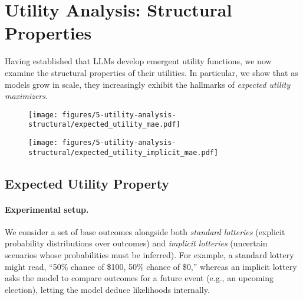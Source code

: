 \section{Utility Analysis: Structural Properties}
\label{sec:structural_properties}

Having established that LLMs develop emergent utility functions, we now examine the structural properties of their utilities. In particular, we show that as models grow in scale, they increasingly exhibit the hallmarks of \emph{expected utility maximizers}.




\begin{figure}[t]
    \centering
    \begin{minipage}[t]{0.49\textwidth}
        \centering
        \texttt{[image: figures/5-utility-analysis-structural/expected\_utility\_mae.pdf]}
        \label{fig:expected_utility_mae}
    \end{minipage}\hfill
    \begin{minipage}[t]{0.49\textwidth}
        \centering
        \texttt{[image: figures/5-utility-analysis-structural/expected\_utility\_implicit\_mae.pdf]}
        \label{fig:expected_utility_implicit_mse}
    \end{minipage}
\end{figure}




\subsection{Expected Utility Property}
\label{sec:expected_utility_property}

\paragraph{Experimental setup.}
We consider a set of base outcomes alongside both \emph{standard lotteries} (explicit probability distributions over outcomes) and \emph{implicit lotteries} (uncertain scenarios whose probabilities must be inferred). For example, a standard lottery might read, ``50\% chance of \$100, 50\% chance of \$0,'' whereas an implicit lottery asks the model to compare outcomes for a future event (e.g., an upcoming election), letting the model deduce likelihoods internally.


